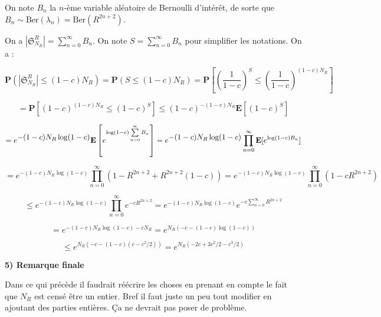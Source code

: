 \documentclass[11pt]{article}
\let\oldsum\sum
\renewcommand{\sum}{\oldsum\limits}
\begin{document}
On note $ B_n $ la $n$-ème variable aléatoire de Bernoulli d'intérêt, de sorte que $ B_n \sim \mathrm{Ber}(\lambda_n) = \mathrm{Ber}(R^{2n + 2}) $. 

On a  $ | \mathfrak S_{N_R}^R | = \sum_{n=0}^\infty B_n $. On note $ S = \sum_{n=0}^\infty B_n $ pour simplifier les notations. On a :

$$ \mathbf P(| \mathfrak S_{N_R}^R | \leqslant (1-c)N_R ) 
= \mathbf P( S \leqslant (1-c)N_R ) 
= \mathbf P\left[ \left( \frac{1}{1-c} \right)^S \leqslant \left( \frac{1}{1-c} \right)^{(1-c)N_R} \right] $$

$$ = \mathbf P\left[ (1-c)^{(1-c)N_R} \leqslant (1-c)^{S} \right] \leqslant (1-c)^{-(1-c)N_R} \mathbf E[(1-c)^{S} ] $$

$$ = e^{\displaystyle -(1-c)N_R \log(1-c) }  \mathbf E\left[ e^{ \log (1-c) \sum\limits_{n=0}^\infty B_n } \right] = e^{\displaystyle -(1-c)N_R \log(1-c) } \prod_{n=0}^\infty \mathbf E[ e^{ \log (1-c) B_n } ] $$

$$ = e^{\displaystyle -(1-c)N_R \log(1-c) } \prod_{n=0}^\infty (1-R^{2n+2} + R^{2n+2}(1-c)) = e^{\displaystyle -(1-c)N_R \log(1-c) } \prod_{n=0}^\infty (1-cR^{2n+2}) $$ 

$$ \leqslant e^{\displaystyle -(1-c)N_R \log(1-c) } \prod_{n=0}^\infty e^{-cR^{2n+2}} = e^{\displaystyle -(1-c)N_R \log(1-c) } e^{-c \sum_{n=0}^\infty R^{2n+2}}$$

$$ = e^{\displaystyle -(1-c)N_R \log(1-c) -c N_R}  = e^{\displaystyle  N_R ( - c-(1-c) \log(1-c) )} $$

$$ \leqslant e^{\displaystyle  N_R ( - c- (1-c)(c-c^2/2))} = e^{\displaystyle  N_R ( -2c + 3c^2/2 - c^3/2)} $$

\textbf{5) Remarque finale} 

Dans ce qui précède il faudrait réécrire les choses en prenant en compte le fait que $ N_R $ est censé être un entier. Bref il faut juste un peu tout modifier en ajoutant des parties entières. Ça ne devrait pas poser de problème.
\end{document}
